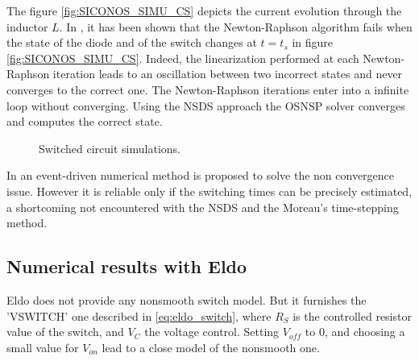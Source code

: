 The figure \ref{fig:SICONOS_SIMU_CS} depicts the current evolution through the inductor $L$. In \cite{maffezzoni2006}, it has been shown that the Newton-Raphson algorithm fails when the state of the diode and of the switch changes at $t=t_s$ in figure \ref{fig:SICONOS_SIMU_CS}. Indeed, the linearization performed at each Newton-Raphson iteration leads to an oscillation between two incorrect states and never converges to the correct one. The Newton-Raphson iterations enter into a infinite loop without converging.  Using the NSDS approach the OSNSP solver converges and computes the correct state. 


\begin{figure}[!ht]
  \hspace{-2mm}
 \caption{Switched circuit simulations.}
\label{figSimuCS}
\end{figure}


\begin{remark}
In \cite{maffezzoni2006} an event-driven numerical method is proposed to solve the non convergence issue. However it is reliable only if the switching times can be precisely estimated, a shortcoming not encountered  with the NSDS and the  Moreau's time-stepping method. 
\end{remark}

\subsection{Numerical results with {\sc Eldo}}
{\sc Eldo} does not provide any nonsmooth switch model. But it furnishes the 'VSWITCH' one described in
\ref{eq:eldo_switch}, where  $R_S$ is the controlled resistor value of the switch, and $V_{C}$ the voltage
control. Setting $V_{off}$ to $0$, and choosing a small value for $V_{on}$ lead to a close model of the nonsmooth one.


